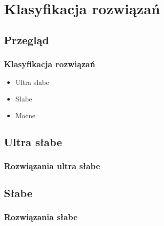 \documentclass[polish,envcountsect,10pt]{beamer}
\begin{document}
    \section{Klasyfikacja rozwiązań}
        \subsection{Przegląd}
            \begin{frame}
                \frametitle{Klasyfikacja rozwiązań}
                \begin{itemize}
                    \item<1-> Ultra słabe
                    \item<2-> Słabe
                    \item<3-> Mocne
                \end{itemize}
            \end{frame}
        \subsection{Ultra słabe}
            \begin{frame}
                \frametitle{Rozwiązania ultra słabe}
            \end{frame}
        \subsection{Słabe}
            \begin{frame}
                \frametitle{Rozwiązania słabe}            
            \end{frame}
\end{document}
